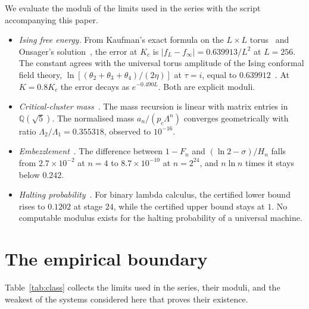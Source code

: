 \documentclass[11pt]{article}
\theoremstyle{definition}\newtheorem{definition}{Definition}[section]
\theoremstyle{remark}\newtheorem*{remark}{Remark}
\begin{document}
We evaluate the moduli of the limits used in the series with the script accompanying this paper.
\begin{itemize}
\item \emph{Ising free energy.} From Kaufman's exact formula on the $L\times L$ torus~\cite{Kaufman} and Onsager's
solution~\cite{Onsager}, the error at $K_c$ is $|f_L-f_\infty|=0.639913/L^2$ at $L=256$. The constant agrees with the universal torus
amplitude of the Ising conformal field theory, $\ln[(\theta_2+\theta_3+\theta_4)/(2\eta)]$ at $\tau=i$, equal to $0.639912$~\cite{DMS}. At
$K=0.8K_c$ the error decays as $e^{-0.490L}$. Both are explicit moduli.
\item \emph{Critical-cluster mass}~\cite{Chen2026_rg}. The mass recursion is linear with matrix entries in $\mathbb Q(\sqrt5)$. The
normalised mass $a_n/(p_c\Lambda^n)$ converges geometrically with ratio $\Lambda_2/\Lambda_1=0.355318$, observed to $10^{-16}$.
\item \emph{Embezzlement}~\cite{Chen2026_certify}. The difference between $1-F_n$ and $(\ln2-\sigma)/H_n$ falls from $2.7\times10^{-2}$ at $n=4$ to
$8.7\times10^{-10}$ at $n=2^{24}$, and $n\ln n$ times it stays below $0.242$.
\item \emph{Halting probability}~\cite{Chen2026_chaitin,Chen2026_fcu}. For binary lambda calculus, the certified lower bound rises
to $0.1202$ at stage $24$, while the certified upper bound stays at $1$. No computable modulus exists for the halting probability of
a universal machine.
\end{itemize}

\section{The empirical boundary}
\label{sec:boundary}

Table~\ref{tab:class} collects the limits used in the series, their moduli, and the weakest of the systems considered
here that proves their existence.
\end{document}
